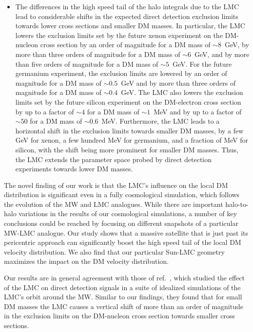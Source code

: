 \begin{itemize}
\item The differences in the high speed tail of the halo integrals due to the LMC lead to considerable shifts in the expected direct detection exclusion limits  towards lower cross sections and smaller DM masses.  
In particular, the LMC lowers the exclusion limits set by the future xenon experiment on the DM-nucleon cross section by an order of magnitude for a DM mass of $\sim 8$~GeV, by more than three orders of magnitude for a DM mass of $\sim 6$~GeV, and by more than five orders of magnitude for a DM mass of $\sim 5$~GeV. For the future germanium experiment, the exclusion limits are lowered by an order of magnitude for a DM mass of $\sim 0.5$~GeV and by more than three orders of magnitude for a DM mass of $\sim 0.4$~GeV. The LMC also lowers the exclusion limits set by the future silicon experiment on the DM-electron cross section by up to a factor of $\sim 4$ for a DM mass of $\sim 1$~MeV and by up to a factor of $\sim 50$ for a DM mass of $\sim 0.6$~MeV. Furthermore, the LMC leads to a horizontal shift in the exclusion limits towards smaller DM masses, by a few GeV for xenon, a few hundred MeV for germanium, and a fraction of MeV for silicon, with the shift being more prominent for smaller DM masses. Thus, the LMC extends the parameter space probed by direct detection experiments towards lower DM masses.


\end{itemize}


The novel finding of our work is that the LMC's influence on the local DM distribution is significant even in a fully cosmological simulation, which follows the evolution of the MW and LMC analogues. While there are important halo-to-halo variations in  the results of our cosmological simulations,  a number of key conclusions could be reached by focusing on different snapshots of a particular MW-LMC analogue. Our study shows that a massive satellite that is just past its pericentric approach can significantly boost the high speed tail of the local DM velocity distribution. We also find that our particular Sun-LMC geometry maximizes the impact on the DM velocity distribution.

Our results are in general agreement with those of ref.~\cite{Besla:2019xbx}, which studied the effect of the LMC on direct detection signals in a suite  of idealized simulations of the LMC's orbit around the MW. Similar to our findings, they found that for small DM masses the LMC causes a vertical shift of more than an order of magnitude in the exclusion limits on the DM-nucleon cross section towards smaller cross sections. 


